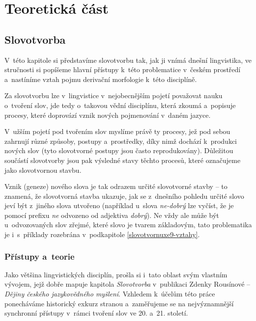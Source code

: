 \part{Teoretická část}

\hypertarget{slovotvorba}{%
\chapter{Slovotvorba}\label{slovotvorba}}

V~této kapitole si představíme slovotvorbu tak, jak ji vnímá dnešní
lingvistika, ve stručnosti si popíšeme hlavní přístupy k~této
problematice v~českém prostředí a~nastíníme vztah pojmu derivační
morfologie k~této disciplíně.

Za slovotvorbu lze v~lingvistice v~nejobecnějším pojetí považovat nauku
o~tvoření slov, jde tedy o~takovou vědní disciplínu, která zkoumá
a~popisuje procesy, které doprovází vznik nových pojmenování v~daném
jazyce.

V~užším pojetí pod tvořením slov myslíme právě ty procesy, jež pod sebou
zahrnují různé způsoby, postupy a~prostředky, díky nimž dochází
k~produkci nových slov (tyto slovotvorné postupy jsou často
reprodukovány). Důležitou součástí slovotvorby jsou pak výsledné stavy
těchto procesů, které označujeme jako slovotvornou stavbu.
\parencite[92]{dokulil00}

Vznik (geneze) nového slova je tak odrazem určité slovotvorné stavby --
to znamená, že slovotvorná stavba ukazuje, jak se z~dnešního pohledu
určité slovo jeví být z~jiného slova utvořeno (například u~slova
\emph{ne-dobrý} lze vyčíst, že je pomocí prefixu \emph{ne} odvozeno od
adjektiva \emph{dobrý}). \parencite[92--93]{dokulil00} Ne vždy ale může
být u~odvozovaných slov zřejmé, které slovo je tvarem základovým, tato
problematika je i~s~příklady rozebrána v~podkapitole
\ref{slovotvornuxe9-vztahy}.

\hypertarget{pux159uxedstupy-a-teorie}{%
\section{Přístupy a~teorie}\label{pux159uxedstupy-a-teorie}}

Jako většina lingvistických disciplín, prošla si i~tato oblast svým
vlastním vývojem, jejž dobře mapuje kapitola \emph{Slovotvorba}
v~publikaci Zdenky Rousínové -- \emph{Dějiny českého jazykovědného
myšlení}. Vzhledem k~účelům této práce ponecháváme historický exkurz
stranou a~zaměřujeme se na nejvýznamnější synchronní přístupy v~rámci
tvoření slov ve 20. a~21. století.

